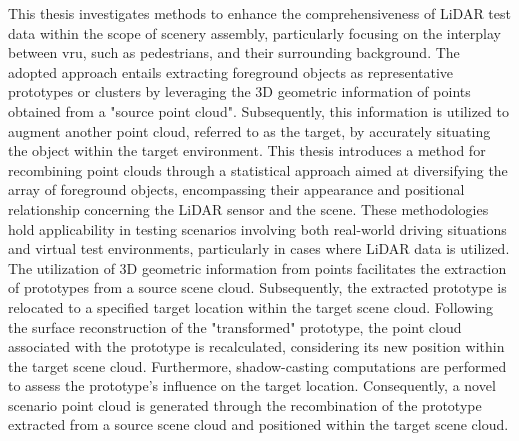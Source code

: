 This thesis investigates methods to enhance the comprehensiveness of LiDAR test data within the scope of scenery assembly, particularly focusing on the interplay between \acrfull{vru}, such as pedestrians, and their surrounding background. The adopted approach entails extracting foreground objects as representative prototypes or clusters by leveraging the 3D geometric information of points obtained from a "source point cloud". Subsequently, this information is utilized to augment another point cloud, referred to as the target, by accurately situating the object within the target environment. This thesis introduces a method for recombining point clouds through a statistical approach aimed at diversifying the array of foreground objects, encompassing their appearance and positional relationship concerning the LiDAR sensor and the scene. These methodologies hold applicability in testing scenarios involving both real-world driving situations and virtual test environments, particularly in cases where LiDAR data is utilized. The utilization of 3D geometric information from points facilitates the extraction of prototypes from a source scene cloud. Subsequently, the extracted prototype is relocated to a specified target location within the target scene cloud. Following the surface reconstruction of the "transformed" prototype, the point cloud associated with the prototype is recalculated, considering its new position within the target scene cloud. Furthermore, shadow-casting computations are performed to assess the prototype's influence on the target location. Consequently, a novel scenario point cloud is generated through the recombination of the prototype extracted from a source scene cloud and positioned within the target scene cloud.
